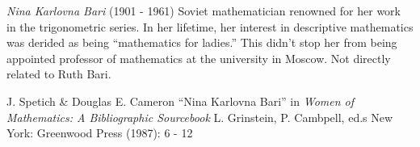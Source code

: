 \documentclass[12pt]{article}
\begin{document}
\emph{Nina Karlovna Bari} (1901 - 1961) Soviet mathematician renowned for her work in the trigonometric series. In her lifetime, her interest in descriptive mathematics was derided as being ``mathematics for ladies.'' This didn't stop her from being appointed professor of mathematics at the university in Moscow. Not directly related to Ruth Bari.

\begin{thebibliography}{1}
 J. Spetich \& Douglas E. Cameron ``Nina Karlovna Bari'' in {\it Women of Mathematics: A Bibliographic Sourcebook} L. Grinstein, P. Cambpell, ed.s New York: Greenwood Press (1987): 6 - 12
\end{thebibliography}
\end{document}
